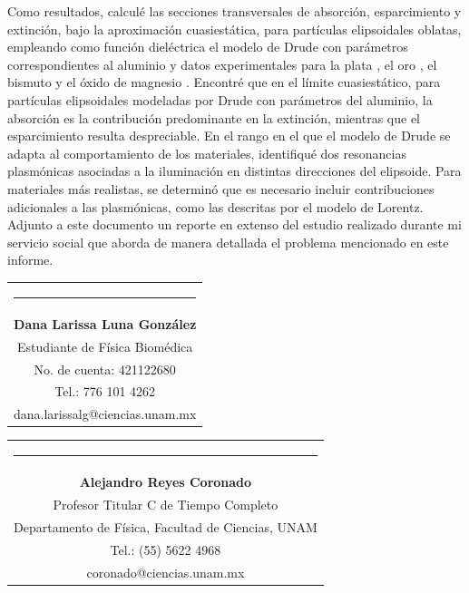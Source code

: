 \documentclass[9pt,letterpaper]{article}
\begin{document}
Como resultados, calculé las secciones transversales de absorción, esparcimiento y extinción, bajo la aproximación cuasiestática, para partículas elipsoidales oblatas, empleando como función dieléctrica el modelo de Drude con parámetros correspondientes al aluminio \cite{Plasmonics} y datos experimentales para la plata \cite{Plata}, el oro \cite{Plata}, el bismuto \cite{Bismuto} y el óxido de magnesio \cite{MgO}. Encontré que en el límite cuasiestático, para partículas elipsoidales modeladas por Drude con parámetros del aluminio, la absorción es la contribución predominante en la extinción, mientras que el esparcimiento resulta despreciable. En el rango en el que el modelo de Drude se adapta al comportamiento de los materiales, identifiqué dos resonancias plasmónicas asociadas a
la iluminación en distintas direcciones del elipsoide. Para materiales más realistas, se determinó que es necesario incluir contribuciones adicionales a las plasmónicas, como las descritas por el modelo de Lorentz. \\

Adjunto a este documento un reporte en extenso del estudio realizado durante mi servicio social que aborda de manera detallada el problema mencionado en este informe.	\\

\bigskip

	{\vspace{2.55cm}\begin{tabular} { c}
			\setlength{\tabcolsep}{15pt}
			\renewcommand{\arraystretch}{1}
			\noindent\rule{5.5cm}{0.4pt}\qquad \\
			
			\qquad  \textbf{Dana Larissa Luna González} \qquad \\
			\qquad Estudiante de Física Biomédica  \qquad \\ \qquad 
			No. de cuenta: 421122680\qquad \\  
			\qquad  Tel.: 776 101 4262 \qquad \\
			\qquad dana.larissalg@ciencias.unam.mx \qquad \\
			
		\end{tabular}
	}
	
	{\vspace{-2.53cm}\hspace{7cm}\begin{tabular} { c}
			\setlength{\tabcolsep}{15pt}
			\renewcommand{\arraystretch}{1}
			\noindent\rule{5.5cm}{0.4pt}\qquad \\
			
			\qquad  \textbf{Alejandro Reyes Coronado} \qquad \\
			\qquad Profesor Titular C de Tiempo Completo  \qquad \\  
			\qquad Departamento de Física, Facultad de Ciencias, UNAM\qquad \\ 
			\qquad  Tel.: (55) 5622 4968 \qquad \\
			\qquad coronado@ciencias.unam.mx \qquad \\
			
		\end{tabular}
		
	}
	
\end{document}
